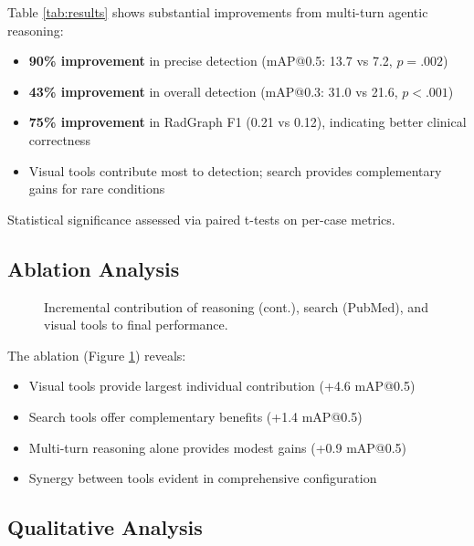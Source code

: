 \documentclass[11pt]{article}
\begin{document}
Table \ref{tab:results} shows substantial improvements from multi-turn agentic reasoning:

\begin{itemize}
    \item \textbf{90\% improvement} in precise detection (mAP@0.5: 13.7 vs 7.2, $p = .002$)
    \item \textbf{43\% improvement} in overall detection (mAP@0.3: 31.0 vs 21.6, $p < .001$)
    \item \textbf{75\% improvement} in RadGraph F1 (0.21 vs 0.12), indicating better clinical correctness
    \item Visual tools contribute most to detection; search provides complementary gains for rare conditions
\end{itemize}

Statistical significance assessed via paired t-tests on per-case metrics.

\subsection{Ablation Analysis}

\begin{figure}[h]
\centering
{}
\caption{Incremental contribution of reasoning (cont.), search (PubMed), and visual tools to final performance.}
\label{fig:ablation}
\end{figure}

The ablation (Figure \ref{fig:ablation}) reveals:

\begin{itemize}
    \item Visual tools provide largest individual contribution (+4.6 mAP@0.5)
    \item Search tools offer complementary benefits (+1.4 mAP@0.5)
    \item Multi-turn reasoning alone provides modest gains (+0.9 mAP@0.5)
    \item Synergy between tools evident in comprehensive configuration
\end{itemize}

\subsection{Qualitative Analysis}
\end{document}

